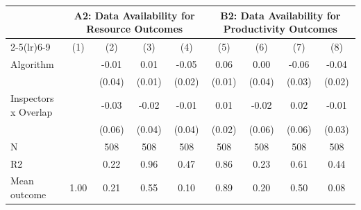 \begin{tabular}{lcccc|cccc}
\midrule
            &\multicolumn{4}{c}{\textbf{A2: Data Availability for Resource Outcomes}}               &\multicolumn{4}{c}{\textbf{B2: Data Availability for Productivity Outcomes}}           \\\cmidrule(lr){2-5}\cmidrule(lr){6-9}
\multicolumn{1}{l}{} & (1) & (2) & (3) & (4) & (5) & (6) & (7) & (8) \\ \midrule
Algorithm   &                     &       -0.01         &        0.01         &       -0.05\sym{**} &        0.06\sym{***}&        0.00         &       -0.06\sym{*}  &       -0.04\sym{*}  \\
            &                     &      (0.04)         &      (0.01)         &      (0.02)         &      (0.01)         &      (0.04)         &      (0.03)         &      (0.02)         \\
\addlinespace
Inspectors x Overlap&                     &       -0.03         &       -0.02         &       -0.01         &        0.01         &       -0.02         &        0.02         &       -0.01         \\
            &                     &      (0.06)         &      (0.04)         &      (0.04)         &      (0.02)         &      (0.06)         &      (0.06)         &      (0.03)         \\
\midrule
N           &                     &         508         &         508         &         508         &         508         &         508         &         508         &         508         \\
R2          &                     &        0.22         &        0.96         &        0.47         &        0.86         &        0.23         &        0.61         &        0.44         \\
Mean outcome&        1.00         &        0.21         &        0.55         &        0.10         &        0.89         &        0.20         &        0.50         &        0.08         \\
\bottomrule \end{tabular}
